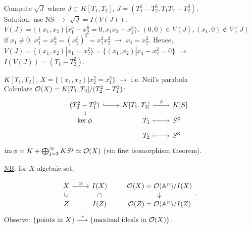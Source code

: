 \documentclass[a4paper,11pt]{article}
\begin{document}
			\begin{exc}
				Compute $\sqrt{J}$ where $J\subset K[T_1,T_2]$, $J=(T_1^3-T_2^6,T_1T_2-T_2^3)$.\\
				Solution: use NS $\rightarrow$ $\sqrt{J}=I(V(J))$. $V(J)=\{(x_1,x_2)|x_1^3-x_2^6=0,x_1x_2-x_2^3\}$. $(0,0)\in V(J), (x_1,0)\notin V(J)$ if $x_1\neq0$. $x_1^3=x_2^6=(x_2^3)^2=x_1^2x_2^2$ $\rightarrow$ $x_1=x_2^2$. Hence, $V(J)=\{(x_1,x_2)|x_1=x_2^2\}=\{(x_1,x_2)|x_1-x_2^2=0\}$ $\Longrightarrow$ $I(V(J))=(T_1-T_2^2)$.
			\end{exc}

			\begin{eg}
				$K[T_1,T_2]$, $X=\{(x_1,x_2)|x_2^2=x_1^3\}$ $\rightarrow$ i.e. Neil's parabola\ \ \ \\Calculate $\mathcal{O}(X)=K[T_1,T_2]/(T_2^2-T_1^3)$:
				\begin{equation*}
					\begin{tikzcd}[row sep=tiny,
						/tikz/column 2/.append style={nodes={anchor=base east}},
						/tikz/column 3/.append style={nodes={anchor=base west}}]
						(T_2^2-T_1^3)\ar[r,hook]\ar[d,equal] & K[T_1,T_2]\ar[r,"\phi"] & K[S]\\\ker\phi& T_1\ar[r,mapsto] & S^2\\ & T_2\ar[r,mapsto] & S^3
					\end{tikzcd}
				\end{equation*}
				$\operatorname{im}\phi=K+\bigoplus_{j=2}^\infty K S^j\simeq\mathcal{O}(X)$ (via first isomorphism theorem).
			\end{eg}	

			\noindent\underline{NB}: for $X$ algebaic set,
			
			\begin{equation*}
				\begin{tikzcd}[row sep=small]
					X\arrow[d,phantom, "\rotatebox{90}{$\subset$}", description]\ar[r,"\simeq"] & I(X)\arrow[d,phantom, "\rotatebox{90}{$\supset$}", description]\\Z & I(Z)
				\end{tikzcd}\qquad
				\begin{tikzcd}[row sep=small]
					\O(X)=\O(\AA^n)/I(X)\ar[d,two heads]\\\O(Z)=\O(\AA^n)/I(Z)
				\end{tikzcd}.
			\end{equation*}
			Observe: $\{\text{points in }X\}\overset{\simeq}{\longrightarrow}\{\text{maximal ideals in }\mathcal{O}(X)\}$.
\end{document}
